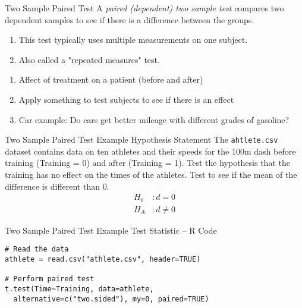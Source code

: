 \documentclass[xcolor=svgnames, 10pt, handout]{beamer}
\begin{document}
\begin{frame}[fragile]{Two Sample Paired Test}
A \emph{paired (dependent) two sample test} compares two dependent samples to see if there is a difference between the groups.
\begin{enumerate}
\item This test typically uses multiple measurements on one subject.
\item Also called a "repeated measures" test.
\end{enumerate}
\vfill
\begin{examples}
\begin{enumerate}
\item Affect of treatment on a patient (before and after)
\item Apply something to test subjects to see if there is an effect
\item Car example: Do cars get better mileage with different grades of gasoline?
\end{enumerate}
\end{examples}

\end{frame}


\begin{frame}[fragile]{Two Sample Paired Test Example Hypothesis Statement}
\vfill
The \verb|ahtlete.csv| dataset contains data on ten athletes and their speeds for the 100m dash before training (Training = 0) and after (Training = 1).
\vfill
Test the hypothesis that the training has no effect on the times of the athletes.  Test to see if the mean of the difference is different than 0.
\begin{align*}
H_0 &: d = 0\\
H_A &: d \neq 0
\end{align*}
\vfill
\end{frame}


\begin{frame}[fragile]{Two Sample Paired Test Example Test Statistic -- R Code}
\begin{Verbatim}[xleftmargin=2em, xrightmargin=1.5em, frame=single, label=Using CI-value, framesep=0.5em, commandchars=\\\{\}, fontsize=\small]
# Read the data
athlete = read.csv("athlete.csv", header=TRUE)

# Perform paired test
t.test(Time~Training, data=athlete, 
  alternative=c("two.sided"), my=0, paired=TRUE)
\end{Verbatim}
\end{frame}
\end{document}
